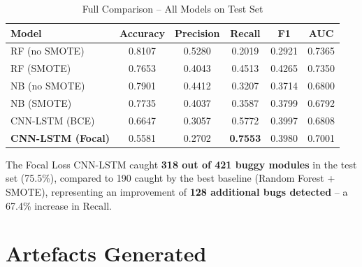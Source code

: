 \documentclass[12pt,a4paper]{article}
\begin{document}
\begin{table}[H]
  \centering
  \caption{Full Comparison -- All Models on Test Set}
  \begin{tabular}{lccccc}
    \toprule
    \textbf{Model} & \textbf{Accuracy} & \textbf{Precision}
      & \textbf{Recall} & \textbf{F1} & \textbf{AUC} \\
    \midrule
    RF (no SMOTE)          & 0.8107 & 0.5280 & 0.2019 & 0.2921 & 0.7365 \\
    RF (SMOTE)             & 0.7653 & 0.4043 & 0.4513 & 0.4265 & 0.7350 \\
    NB (no SMOTE)          & 0.7901 & 0.4412 & 0.3207 & 0.3714 & 0.6800 \\
    NB (SMOTE)             & 0.7735 & 0.4037 & 0.3587 & 0.3799 & 0.6792 \\
    CNN-LSTM (BCE)         & 0.6647 & 0.3057 & 0.5772 & 0.3997 & 0.6808 \\
    \rowcolor{lightgray}
    \textbf{CNN-LSTM (Focal)} & 0.5581 & 0.2702 & \textbf{0.7553}
      & 0.3980 & 0.7001 \\
    \bottomrule
  \end{tabular}
\end{table}

\noindent The Focal Loss CNN-LSTM caught \textbf{318 out of 421 buggy modules}
in the test set (75.5\%), compared to 190 caught by the best baseline
(Random Forest + SMOTE), representing an improvement of \textbf{128
additional bugs detected} -- a 67.4\% increase in Recall.

\section{Artefacts Generated}
\end{document}
